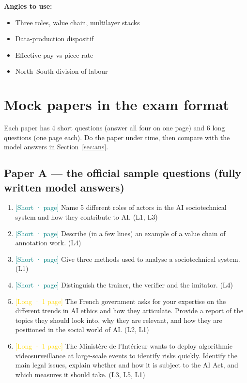 \documentclass[11pt,a4paper]{article}
\begin{document}
\textbf{Angles to use:}\begin{itemize}[nosep]\item Three roles, value chain, multilayer stacks\item Data-production dispositif\item Effective pay vs piece rate\item North–South division of labour\end{itemize}
\section{Mock papers in the exam format}
Each paper has 4 short questions (answer all four on one page) and 6 long questions (one page each). Do the paper under time, then compare with the model answers in Section~\ref{sec:ans}.
\subsection{Paper A — the official sample questions (fully written model answers)}\begin{enumerate}[label=\textbf{Q\arabic*.},leftmargin=2.4em]
\item \textcolor{teal}{[Short · \textonequarter{} page]} Name 5 different roles of actors in the AI sociotechnical system and how they contribute to AI. {\small\color{gray}(L1, L3)}
\item \textcolor{teal}{[Short · \textonequarter{} page]} Describe (in a few lines) an example of a value chain of annotation work. {\small\color{gray}(L4)}
\item \textcolor{teal}{[Short · \textonequarter{} page]} Give three methods used to analyse a sociotechnical system. {\small\color{gray}(L1)}
\item \textcolor{teal}{[Short · \textonequarter{} page]} Distinguish the trainer, the verifier and the imitator. {\small\color{gray}(L4)}
\item \textcolor{gold}{[Long · 1 page]} The French government asks for your expertise on the different trends in AI ethics and how they articulate. Provide a report of the topics they should look into, why they are relevant, and how they are positioned in the social world of AI. {\small\color{gray}(L2, L1)}
\item \textcolor{gold}{[Long · 1 page]} The Ministère de l’Intérieur wants to deploy algorithmic videosurveillance at large-scale events to identify risks quickly. Identify the main legal issues, explain whether and how it is subject to the AI Act, and which measures it should take. {\small\color{gray}(L3, L5, L1)}

\end{enumerate}
\end{document}
